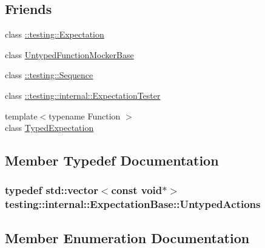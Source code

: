 \subsection*{Friends}
\begin{DoxyCompactItemize}
\item 
class \hyperlink{classtesting_1_1internal_1_1ExpectationBase_a86fa3dccdc465d897ee321b74e4ce915}{\+::testing\+::\+Expectation}
\item 
class \hyperlink{classtesting_1_1internal_1_1ExpectationBase_a3e5598b244ec7673d0a494477d71e559}{Untyped\+Function\+Mocker\+Base}
\item 
class \hyperlink{classtesting_1_1internal_1_1ExpectationBase_aeaf43a487a21c0ac1135b094a1561056}{\+::testing\+::\+Sequence}
\item 
class \hyperlink{classtesting_1_1internal_1_1ExpectationBase_a83859ffda7f75bb8b447063eb53cb8b8}{\+::testing\+::internal\+::\+Expectation\+Tester}
\item 
{\footnotesize template$<$typename Function $>$ }\\class \hyperlink{classtesting_1_1internal_1_1ExpectationBase_a4f17de55396a8ef740d5ad2b1380a851}{Typed\+Expectation}
\end{DoxyCompactItemize}


\subsection{Member Typedef Documentation}
\subsubsection[{\texorpdfstring{Untyped\+Actions}{UntypedActions}}]{\setlength{\rightskip}{0pt plus 5cm}typedef std\+::vector$<$const void$\ast$$>$ {\bf testing\+::internal\+::\+Expectation\+Base\+::\+Untyped\+Actions}\hspace{0.3cm}{\ttfamily [protected]}}\hypertarget{classtesting_1_1internal_1_1ExpectationBase_a9b21e82059961b9f1198d3f5d518254f}{}\label{classtesting_1_1internal_1_1ExpectationBase_a9b21e82059961b9f1198d3f5d518254f}


\subsection{Member Enumeration Documentation}
